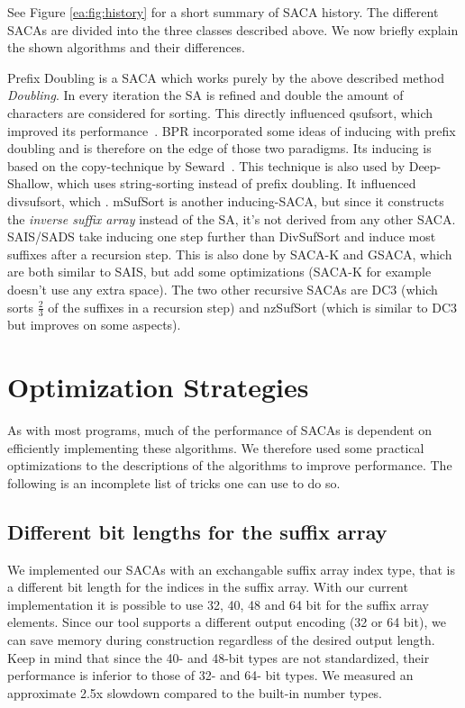 See Figure \ref{ea:fig:history} for a short summary of SACA history.
The different SACAs are divided into the three classes described above.
We now briefly explain the shown algorithms and their differences.

Prefix Doubling is a SACA which works purely by the above described method \emph{Doubling}.
In every iteration the SA is refined and double the amount of characters are considered for sorting.
This directly influenced qsufsort, which improved its performance~\cite{hermann?}.
BPR incorporated some ideas of inducing with prefix doubling and is therefore on the edge of those two paradigms.
Its inducing is based on the copy-technique by Seward~\cite{seward2000}.
This technique is also used by Deep-Shallow, which uses string-sorting instead of prefix doubling.
It influenced divsufsort, which .
mSufSort is another inducing-SACA, but since it constructs the \emph{inverse suffix array} instead of the SA,
it's not derived from any other SACA.
SAIS/SADS take inducing one step further than DivSufSort and induce most suffixes after a recursion step.
This is also done by SACA-K and GSACA, which are both similar to SAIS, but add some optimizations
(SACA-K for example doesn't use any extra space).
The two other recursive SACAs are DC3 (which sorts $\frac{2}{3}$ of the suffixes in a recursion step)
and nzSufSort (which is similar to DC3 but improves on some aspects).

\section{Optimization Strategies}

As with most programs, much of the performance of SACAs is dependent on efficiently implementing these algorithms.
We therefore used some practical optimizations to the descriptions of the algorithms to improve performance.
The following is an incomplete list of tricks one can use to do so.

\subsection{Different bit lengths for the suffix array}

We implemented our SACAs with an exchangable suffix array index type, that is a different bit length for the indices in the suffix array.
With our current implementation it is possible to use 32, 40, 48 and 64 bit for the suffix array elements.
Since our tool supports a different output encoding (32 or 64 bit), we can save memory during construction regardless of the desired output length.
Keep in mind that since the 40- and 48-bit types are not standardized, their performance is inferior to those of 32- and 64- bit types.
We measured an approximate 2.5x slowdown compared to the built-in number types.

